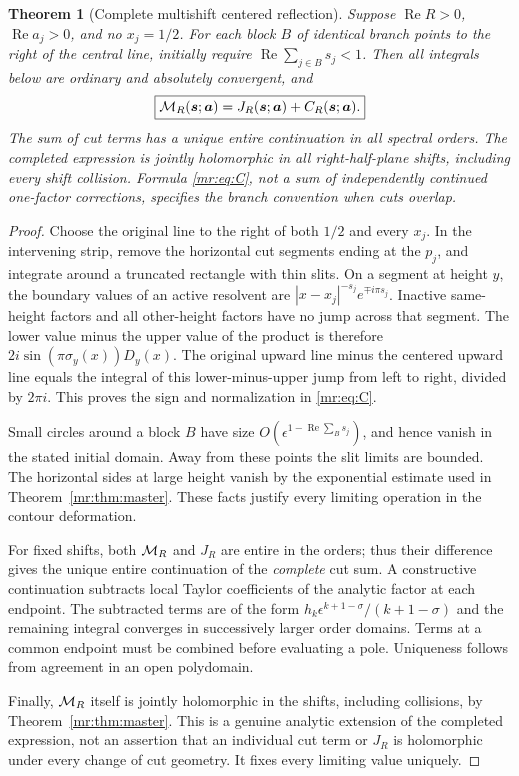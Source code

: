 \documentclass[11pt,letterpaper]{article}
\newtheorem{theorem}{Theorem}[section]
\theoremstyle{definition}\newtheorem{definition}[theorem]{Definition}
\theoremstyle{remark}\newtheorem{remark}[theorem]{Remark}
\newcommand{\Rea}{\operatorname{Re}}\newcommand{\Ima}{\operatorname{Im}}
\begin{document}
\begin{theorem}[Complete multishift centered reflection]\label{mr:thm:cut}
Suppose $\Rea R>0$, $\Rea a_j>0$, and no $x_j=1/2$.
For each block $B$ of identical branch points to the right of the
central line, initially require $\Rea\sum_{j\in B}s_j<1$.
Then all integrals below are ordinary and absolutely convergent, and
\begin{equation}\label{mr:eq:complete}
 \boxed{\mathcal M_R(\boldsymbol s;\boldsymbol a)
       =J_R(\boldsymbol s;\boldsymbol a)
        +C_R(\boldsymbol s;\boldsymbol a).}
\end{equation}
The \emph{sum} of cut terms has a unique entire continuation in all
spectral orders. The completed expression is jointly holomorphic in
all right-half-plane shifts, including every shift collision. Formula
\eqref{mr:eq:C}, not a sum of independently continued one-factor
corrections, specifies the branch convention when cuts overlap.
\end{theorem}
\begin{proof}
Choose the original line to the right of both $1/2$ and every $x_j$.
In the intervening strip, remove the horizontal cut segments ending
at the $p_j$, and integrate around a truncated rectangle with thin
slits. On a segment at height $y$, the boundary values of an active
resolvent are $|x-x_j|^{-s_j}e^{\mp i\pi s_j}$.
Inactive same-height factors and all other-height factors have no jump
across that segment. The lower value minus the upper value of the
product is therefore $2i\sin(\pi\sigma_y(x))D_y(x)$.
The original upward line minus the centered upward line equals the
integral of this lower-minus-upper jump from left to right, divided by
$2\pi i$. This proves the sign and normalization in \eqref{mr:eq:C}.

Small circles around a block $B$ have size
$O(\epsilon^{1-\Rea\sum_{B}s_j})$, and hence vanish in the stated
initial domain. Away from these points the slit limits are bounded.
The horizontal sides at large height vanish by the exponential estimate
used in Theorem~\ref{mr:thm:master}. These facts justify every limiting
operation in the contour deformation.

For fixed shifts, both $\mathcal M_R$ and $J_R$ are entire in the orders;
thus their difference gives the unique entire continuation of the
\emph{complete} cut sum. A constructive continuation subtracts local
Taylor coefficients of the analytic factor at each endpoint. The
subtracted terms are of the form
$h_k\epsilon^{k+1-\sigma}/(k+1-\sigma)$ and the remaining integral
converges in successively larger order domains. Terms at a common
endpoint must be combined before evaluating a pole. Uniqueness follows
from agreement in an open polydomain.

Finally, $\mathcal M_R$ itself is jointly holomorphic in the shifts, including
collisions, by Theorem~\ref{mr:thm:master}. This is a genuine analytic
extension of the completed expression, not an assertion that an
individual cut term or $J_R$ is holomorphic under every change of cut
geometry. It fixes every limiting value uniquely.
\end{proof}
\end{document}
